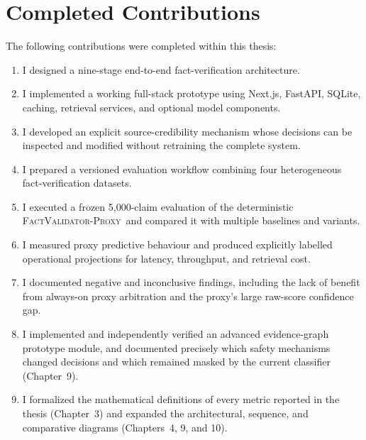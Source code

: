 \documentclass[12pt,a4paper,openany]{report}
\newcommand{\proxy}{\textsc{FactValidator-Proxy}}
\begin{document}
\section{Completed Contributions}
The following contributions were completed within this thesis:
\begin{enumerate}
  \item I designed a nine-stage end-to-end fact-verification architecture.
  \item I implemented a working full-stack prototype using Next.js, FastAPI, SQLite, caching, retrieval services, and optional model components.
  \item I developed an explicit source-credibility mechanism whose decisions can be inspected and modified without retraining the complete system.
  \item I prepared a versioned evaluation workflow combining four heterogeneous fact-verification datasets.
  \item I executed a frozen 5{,}000-claim evaluation of the deterministic \proxy\ and compared it with multiple baselines and variants.
  \item I measured proxy predictive behaviour and produced explicitly labelled operational projections for latency, throughput, and retrieval cost.
  \item I documented negative and inconclusive findings, including the lack of benefit from always-on proxy arbitration and the proxy's large raw-score confidence gap.
  \item I implemented and independently verified an advanced evidence-graph prototype module, and documented precisely which safety mechanisms changed decisions and which remained masked by the current classifier (Chapter~9).
  \item I formalized the mathematical definitions of every metric reported in the thesis (Chapter~3) and expanded the architectural, sequence, and comparative diagrams (Chapters~4, 9, and 10).
\end{enumerate}
\end{document}
